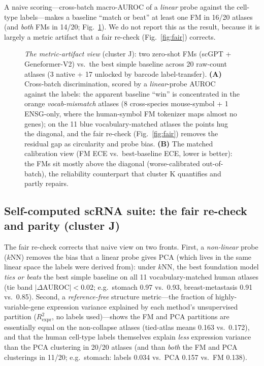 \documentclass[11pt]{article}
\begin{document}
A naive scoring---cross-batch macro-AUROC of a \emph{linear} probe against the cell-type labels---makes a baseline ``match or beat'' at least one FM in 16/20 atlases (and \emph{both} FMs in 14/20; Fig.~\ref{fig:fmvsbase}). We do not report this as the result, because it is largely a metric artifact that a fair re-check (Fig.~\ref{fig:fair}) corrects.

\begin{figure}[htb]\centering
\caption{\emph{The metric-artifact view} (cluster J): two zero-shot FMs (scGPT + Geneformer-V2) vs.\ the best simple baseline across 20 raw-count atlases (3 native + 17 unlocked by barcode label-transfer). \textbf{(A)} Cross-batch discrimination, scored by a \emph{linear}-probe AUROC against the labels: the apparent baseline ``win'' is concentrated in the orange \emph{vocab-mismatch} atlases (8 cross-species mouse-symbol + 1 ENSG-only, where the human-symbol FM tokenizer maps almost no genes); on the 11 blue vocabulary-matched atlases the points hug the diagonal, and the fair re-check (Fig.~\ref{fig:fair}) removes the residual gap as circularity and probe bias. \textbf{(B)} The matched calibration view (FM ECE vs.\ best-baseline ECE, lower is better): the FMs sit mostly above the diagonal (worse-calibrated out-of-batch), the reliability counterpart that cluster K quantifies and partly repairs.}\label{fig:fmvsbase}\end{figure}

\subsection{Self-computed scRNA suite: the fair re-check and parity (cluster J)}
The fair re-check corrects that naive view on two fronts. First, a \emph{non-linear} probe ($k$NN) removes the bias that a linear probe gives PCA (which lives in the same linear space the labels were derived from): under $k$NN, the best foundation model \emph{ties or beats} the best simple baseline on all 11 vocabulary-matched human atlases (tie band $|\Delta\mathrm{AUROC}|<0.02$; e.g.\ stomach 0.97 vs.\ 0.93, breast-metastasis 0.91 vs.\ 0.85). Second, a \emph{reference-free} structure metric---the fraction of highly-variable-gene expression variance explained by each method's unsupervised partition ($R^2_{\mathrm{expr}}$, no labels used)---shows the FM and PCA partitions are essentially equal on the non-collapse atlases (tied-atlas means 0.163 vs.\ 0.172), and that the human cell-type labels themselves explain \emph{less} expression variance than the PCA clustering in 20/20 atlases (and than \emph{both} the FM and PCA clusterings in 11/20; e.g.\ stomach: labels 0.034 vs.\ PCA 0.157 vs.\ FM 0.138).
\end{document}

